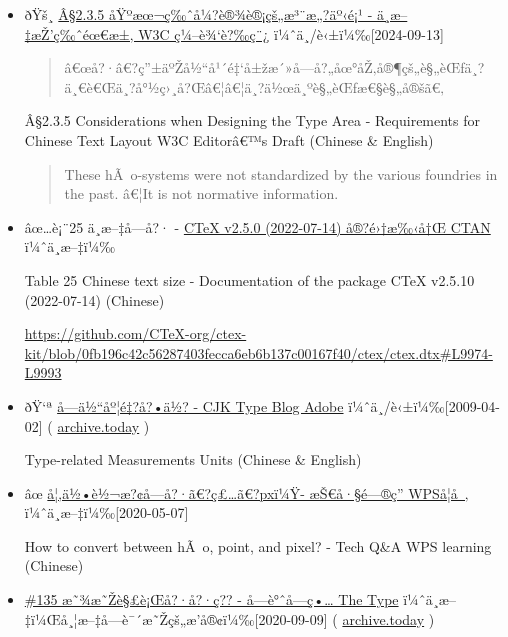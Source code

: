 \begin{itemize}
\item
  ðŸš¸
  \href{https://www.w3.org/International/clreq/\#considerations_in_designing_type_area}{Â§2.3.5
  åŸºæœ¬ç‰ˆå¼?è®¾è®¡çš„æ³¨æ„?äº‹é¡¹ - ä¸­æ--‡æŽ'ç‰ˆéœ€æ±‚ \textbar{} W3C
  ç¼--è¾`è?‰ç¨¿} ï¼ˆä¸­/è‹±ï¼‰{[}2024-09-13{]}

  \begin{quote}
  â€œå?·â€?ç''±äºŽå½``å¹´é‡`å±žæ´»å­---å?„åœ°åŽ‚å®¶çš„è§„èŒƒä¸?ä¸€è€Œä¸?å°½ç›¸å?Œâ€¦â€¦ä¸?ä½œä¸ºè§„èŒƒæ€§è§„å®šã€‚
  \end{quote}

  Â§2.3.5 Considerations when Designing the Type Area - Requirements for
  Chinese Text Layout \textbar{} W3C Editorâ€™s Draft (Chinese \&
  English)

  \begin{quote}
  These hÃ~o-systems were not standardized by the various foundries in
  the past. â€¦It is not normative information.
  \end{quote}
\item
  âœ\ldots è¡¨25 ä¸­æ--‡å­---å?· -
  \href{http://mirrors.ctan.org/language/chinese/ctex/ctex.pdf}{CTeX
  v2.5.0 (2022-07-14) å®?é›†æ‰‹å†Œ \textbar{} CTAN} ï¼ˆä¸­æ--‡ï¼‰

  Table 25 Chinese text size - Documentation of the package CTeX v2.5.10
  (2022-07-14) (Chinese)

  \url{https://github.com/CTeX-org/ctex-kit/blob/0fb196c42c56287403fecca6eb6b137c00167f40/ctex/ctex.dtx\#L9974-L9993}
\item
  ðŸ`ª
  \href{https://ccjktype.fonts.adobe.com/2009/04/post_1.html}{å­---ä½``åº¦é‡?å?•ä½?
  - CJK Type Blog \textbar{} Adobe} ï¼ˆä¸­/è‹±ï¼‰{[}2009-04-02{]} (
  \href{https://archive.today/QxXuk}{archive.today} )

  Type-related Measurements Units (Chinese \& English)
\item
  âœ
  \href{https://www.wps.cn/learning/question/detail/id/2940}{å¦‚ä½•è½¬æ?¢å­---å?·ã€?ç£\ldots ã€?pxï¼Ÿ-
  æŠ€å·§é---®ç­'' \textbar{} WPSå­¦å~‚} ï¼ˆä¸­æ--‡ï¼‰{[}2020-05-07{]}

  How to convert between hÃ~o, point, and pixel? - Tech Q\&A \textbar{}
  WPS learning (Chinese)
\item
  \href{https://www.thetype.com/typechat/ep-135/}{\#135
  æ˜¾æ˜Žè§£è¡Œå?·å?·ç?? - å­---è°ˆå­---ç•\ldots{} \textbar{} The Type}
  ï¼ˆä¸­æ--‡ï¼Œå¸¦æ--‡å­---è¯´æ˜Žçš„æ'­å®¢ï¼‰{[}2020-09-09{]} (
  \href{https://archive.today/qaG8D}{archive.today} )


\end{itemize}
